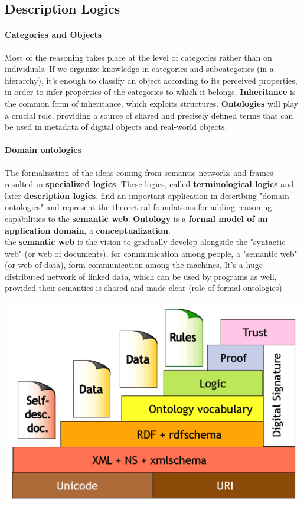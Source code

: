\documentclass[10pt]{report}
\begin{document}
\subsection{Description Logics} 
\paragraph{Categories and Objects} Most of the reasoning takes place at the level of categories rather than on individuals. If we organize knowledge in categories and subcategories (in a hierarchy), it's enough to classify an object according to its perceived properties, in order to infer properties of the categories to which it belongs. \textbf{Inheritance} is the common form of inheritance, which exploits structures. \textbf{Ontologies} will play a crucial role, providing a source of shared and precisely defined terms that can be used in metadata of digital objects and real-world objects.
\paragraph{Domain ontologies} The formalization of the ideas coming from semantic networks and frames resulted in \textbf{specialized logics}. These logics, called \textbf{terminological logics} and later \textbf{description logics}, find an important application in describing "domain ontologies" and represent the theoretical foundations for adding reasoning capabilities to the \textbf{semantic web}. \textbf{Ontology} is a \textbf{formal model of an application domain}, a \textbf{conceptualization}.\\
the \textbf{semantic web} is the vision to gradually develop alongside the "syntactic web" (or web of documents), for communication among people, a "semantic web" (or web of data), form communication among the machines. It's a huge distributed network of linked data, which can be used by programs as well, provided their semantics is shared and made clear (role of formal ontologies).
\begin{center}
	\includegraphics[scale=0.5]{19.png}
\end{center}
\end{document}
